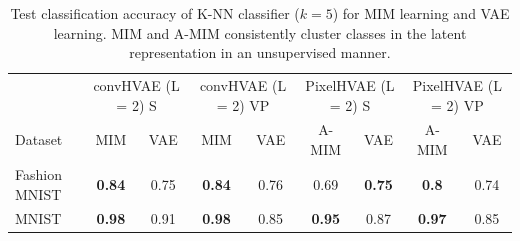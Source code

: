 \begin{table}[t]
    \centering
    \setlength{\tabcolsep}{0.5em} %
    {
    \scriptsize
    \renewcommand{\arraystretch}{1.2}%
    \begin{tabular}{l||c|c||c|c||c|c||c|c||}
         \multicolumn{1}{l||}{} &  \multicolumn{2}{c||}{convHVAE (L = 2) S}  & \multicolumn{2}{c||}{convHVAE (L = 2) VP}  & \multicolumn{2}{c||}{PixelHVAE (L = 2) S}  & \multicolumn{2}{c||}{PixelHVAE (L = 2) VP} \\
         Dataset & {\tiny MIM}  & {\tiny VAE} & {\tiny MIM}  & {\tiny VAE} & {\tiny A-MIM} & {\tiny VAE} & {\tiny A-MIM} & {\tiny VAE}  \\
        \hline
        \multirow{1}{*}{Fashion MNIST}
        & \textbf{0.84}  & 0.75 & \textbf{0.84}  & 0.76  & 0.69 & \textbf{0.75} & \textbf{0.8} & 0.74 \\
        \hline
        \multirow{1}{*}{MNIST}
        & \textbf{0.98}  & 0.91  & \textbf{0.98}  & 0.85 & \textbf{0.95} & 0.87 & \textbf{0.97} & 0.85 \\
    \end{tabular}
    }
    \vspace*{0.5cm}
    \caption{Test classification accuracy of K-NN classifier ($k = 5$) for MIM learning and VAE learning. MIM and A-MIM consistently cluster classes in the latent representation in an unsupervised manner.}
    \label{tab:mim-vs-vae-image-quantitative-cls}
\end{table}


